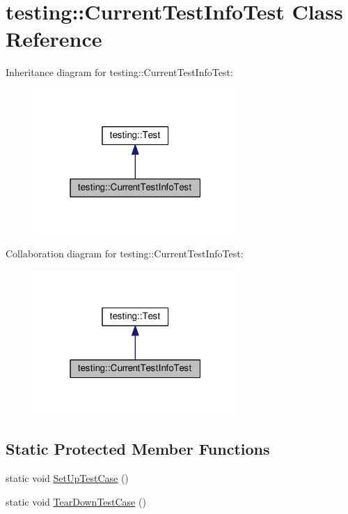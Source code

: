 \hypertarget{classtesting_1_1CurrentTestInfoTest}{}\section{testing\+:\+:Current\+Test\+Info\+Test Class Reference}
\label{classtesting_1_1CurrentTestInfoTest}


Inheritance diagram for testing\+:\+:Current\+Test\+Info\+Test\+:
\nopagebreak
\begin{figure}[H]
\begin{center}
\leavevmode
\includegraphics[width=220pt]{classtesting_1_1CurrentTestInfoTest__inherit__graph}
\end{center}
\end{figure}


Collaboration diagram for testing\+:\+:Current\+Test\+Info\+Test\+:
\nopagebreak
\begin{figure}[H]
\begin{center}
\leavevmode
\includegraphics[width=220pt]{classtesting_1_1CurrentTestInfoTest__coll__graph}
\end{center}
\end{figure}
\subsection*{Static Protected Member Functions}
\begin{DoxyCompactItemize}
\item 
static void \hyperlink{classtesting_1_1CurrentTestInfoTest_a61bad7ce29923afd464daf9684b6269e}{Set\+Up\+Test\+Case} ()
\item 
static void \hyperlink{classtesting_1_1CurrentTestInfoTest_a9a80a5a3e6e70c619870c2ae9df892a6}{Tear\+Down\+Test\+Case} ()
\end{DoxyCompactItemize}
